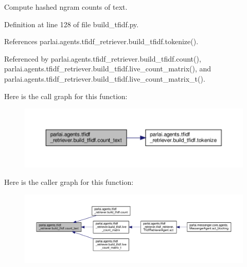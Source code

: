 \begin{DoxyVerb}Compute hashed ngram counts of text.\end{DoxyVerb}
 

Definition at line 128 of file build\+\_\+tfidf.\+py.



References parlai.\+agents.\+tfidf\+\_\+retriever.\+build\+\_\+tfidf.\+tokenize().



Referenced by parlai.\+agents.\+tfidf\+\_\+retriever.\+build\+\_\+tfidf.\+count(), parlai.\+agents.\+tfidf\+\_\+retriever.\+build\+\_\+tfidf.\+live\+\_\+count\+\_\+matrix(), and parlai.\+agents.\+tfidf\+\_\+retriever.\+build\+\_\+tfidf.\+live\+\_\+count\+\_\+matrix\+\_\+t().

Here is the call graph for this function\+:
\nopagebreak
\begin{figure}[H]
\begin{center}
\leavevmode
\includegraphics[width=350pt]{namespaceparlai_1_1agents_1_1tfidf__retriever_1_1build__tfidf_a76bae1c966a21d123cb91949d6c8ec20_cgraph}
\end{center}
\end{figure}
Here is the caller graph for this function\+:
\nopagebreak
\begin{figure}[H]
\begin{center}
\leavevmode
\includegraphics[width=350pt]{namespaceparlai_1_1agents_1_1tfidf__retriever_1_1build__tfidf_a76bae1c966a21d123cb91949d6c8ec20_icgraph}
\end{center}
\end{figure}
\mbox{\label{namespaceparlai_1_1agents_1_1tfidf__retriever_1_1build__tfidf_a8f16fdf4641c497d12c19f128ed4647a}} 
